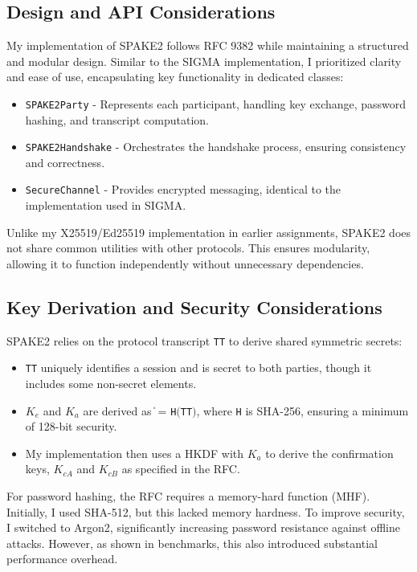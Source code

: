 \documentclass[twoside,a4paper,12pt]{article}
\begin{document}
\subsection{Design and API Considerations}
\label{subsec:spake2_design}

My implementation of SPAKE2 follows RFC 9382 \cite{rfc9382} while maintaining a structured and modular design. Similar to the SIGMA implementation, I prioritized clarity and ease of use, encapsulating key functionality in dedicated classes:

\begin{itemize}
    \item \texttt{SPAKE2Party} - Represents each participant, handling key exchange, password hashing, and transcript computation.
    \item \texttt{SPAKE2Handshake} - Orchestrates the handshake process, ensuring consistency and correctness.
    \item \texttt{SecureChannel} - Provides encrypted messaging, identical to the implementation used in SIGMA.
\end{itemize}

Unlike my X25519/Ed25519 implementation in earlier assignments, SPAKE2 does not share common utilities with other protocols. This ensures modularity, allowing it to function independently without unnecessary dependencies.

\subsection{Key Derivation and Security Considerations}
\label{subsec:spake2_keys}

SPAKE2 relies on the protocol transcript \texttt{TT} to derive shared symmetric secrets:

\begin{itemize}
    \item \texttt{TT} uniquely identifies a session and is secret to both parties, though it includes some non-secret elements.
    \item $K_e$ and $K_a$ are derived as   \|  = \texttt{H}$($\texttt{TT}$)$, where \texttt{H} is SHA-256, ensuring a minimum of 128-bit security.
    \item My implementation then uses a HKDF with $K_a$ to derive the confirmation keys, $K_{cA}$ and $K_{cB}$ as specified in the RFC.
\end{itemize}

For password hashing, the RFC requires a memory-hard function (MHF). Initially, I used SHA-512, but this lacked memory hardness. To improve security, I switched to Argon2, significantly increasing password resistance against offline attacks. However, as shown in benchmarks, this also introduced substantial performance overhead.
\end{document}
